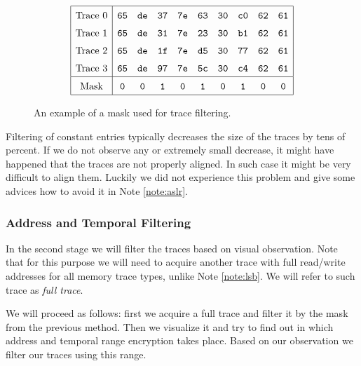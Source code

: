 	\begin{figure}[H]
	\[
	\arraycolsep=.5em\def\arraystretch{1.5}
		\begin{array}{|c|ccccccccc|}
			\hline
			\textnormal{Trace 0} & {\tt 65} & {\tt de} & {\tt 37} & {\tt 7e} & {\tt 63} & {\tt 30} & {\tt c0} & {\tt 62} & {\tt 61} \\
			\textnormal{Trace 1} & {\tt 65} & {\tt de} & {\tt 31} & {\tt 7e} & {\tt 23} & {\tt 30} & {\tt b1} & {\tt 62} & {\tt 61} \\
			\textnormal{Trace 2} & {\tt 65} & {\tt de} & {\tt 1f} & {\tt 7e} & {\tt d5} & {\tt 30} & {\tt 77} & {\tt 62} & {\tt 61} \\
			\textnormal{Trace 3} & {\tt 65} & {\tt de} & {\tt 97} & {\tt 7e} & {\tt 5c} & {\tt 30} & {\tt c4} & {\tt 62} & {\tt 61} \\
			\hline
			\textnormal{Mask}    & {\tt 0}  & {\tt 0}  & {\tt 1}  & {\tt 0}  & {\tt 1}  & {\tt 0}  & {\tt 1}  & {\tt 0}  & {\tt 0} \\
			\hline
		\end{array}
	\]
	\caption{An example of a mask used for trace filtering.}
	\label{fig:constmask}
	\end{figure}
	
	\begin{note}
	\label{note:filter}
		Filtering of constant entries typically decreases the size of the traces by tens of percent. If we do not observe any or extremely small decrease, it might have happened that the traces are not properly aligned. In such case it might be very difficult to align them. Luckily we did not experience this problem and give some advices how to avoid it in Note \ref{note:aslr}.
	\end{note}

\newcommand{\AddrTempFilter}{Address and Temporal Filtering}
\subsubsection{\AddrTempFilter}
	
	In the second stage we will filter the traces based on visual observation. Note that for this purpose we will need to acquire another trace with full read/write addresses for all memory trace types, unlike Note \ref{note:lsb}. We will refer to such trace as {\em full trace}.
	
	We will proceed as follows: first we acquire a full trace and filter it by the mask from the previous method. Then we visualize it and try to find out in which address and temporal range encryption takes place. Based on our observation we filter our traces using this range.
	
